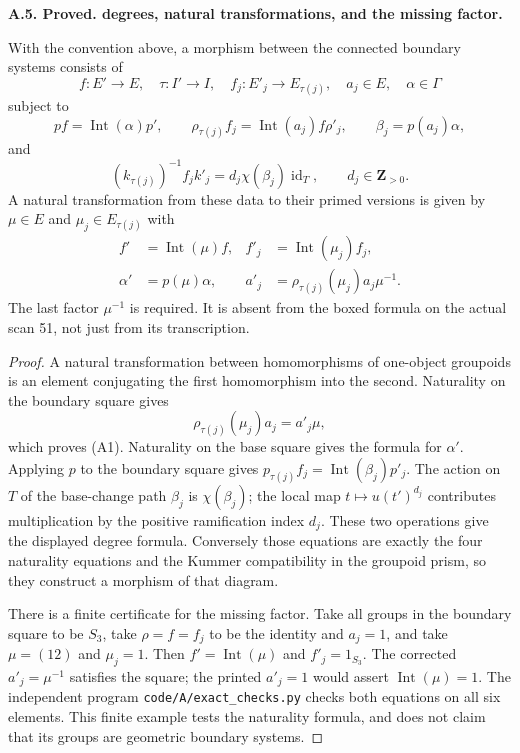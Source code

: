 \documentclass[11pt,oneside]{article}
\makeatletter
\newcounter{statementanchor}
\newenvironment{statement}[3]{%
 \refstepcounter{statementanchor}\def\@currentlabel{#1}%
 \par\addvspace{9pt}\noindent
 \textbf{#1. #2. #3.}\par\nobreak\noindent\ignorespaces
}{\par\addvspace{5pt}}
\makeatother
\begin{document}
\begin{statement}{A.5}{Proved}{degrees, natural transformations, and the missing factor}
\label{st:A.5}
\label{A:two-morphisms}
With the convention above, a morphism between the connected boundary
systems consists of
\[
 f:E'\to E,\quad \tau:I'\to I,\quad f_j:E'_j\to E_{\tau(j)},
 \quad a_j\in E,\quad \alpha\in\Gamma
\]
subject to
\[
 pf=\operatorname{Int}(\alpha)p',\qquad
 \rho_{\tau(j)}f_j=\operatorname{Int}(a_j)f\rho'_j,
 \qquad \beta_j=p(a_j)\alpha,
\]
and
\[
 (k_{\tau(j)})^{-1}f_jk'_j
       =d_j\chi(\beta_j)\operatorname{id}_T,
       \qquad d_j\in\mathbf Z_{>0}.
\]
A natural transformation from these data to their primed versions is
given by $\mu\in E$ and $\mu_j\in E_{\tau(j)}$ with
\[
\begin{aligned}
 f'&=\operatorname{Int}(\mu)f,&
 f'_j&=\operatorname{Int}(\mu_j)f_j,\\
 \alpha'&=p(\mu)\alpha,&
 a'_j&=\rho_{\tau(j)}(\mu_j)a_j\mu^{-1}.
\end{aligned}                                                  \tag{A1}
\]
The last factor $\mu^{-1}$ is required.  It is absent from the boxed
formula on the actual scan 51, not just from its transcription.
\end{statement}
\begin{proof}
A natural transformation between homomorphisms of one-object
groupoids is an element conjugating the first homomorphism into the
second.  Naturality on the boundary square gives
\[
 \rho_{\tau(j)}(\mu_j)a_j=a'_j\mu,
\]
which proves (A1).  Naturality on the base square gives the formula
for $\alpha'$.  Applying $p$ to the boundary square gives
$p_{\tau(j)}f_j=\operatorname{Int}(\beta_j)p'_j$.  The action on
$T$ of the base-change path $\beta_j$ is $\chi(\beta_j)$; the
local map $t\mapsto u(t')^{d_j}$ contributes multiplication by the
positive ramification index $d_j$.  These two operations give the
displayed degree formula.  Conversely those equations are exactly
the four naturality equations and the Kummer compatibility in the
groupoid prism, so they construct a morphism of that diagram.

There is a finite certificate for the missing factor.  Take all
groups in the boundary square to be $S_3$, take $\rho=f=f_j$ to be
the identity and $a_j=1$, and take $\mu=(12)$ and $\mu_j=1$.
Then $f'=\operatorname{Int}(\mu)$ and $f'_j=1_{S_3}$.
The corrected $a'_j=\mu^{-1}$ satisfies the square; the printed
$a'_j=1$ would assert $\operatorname{Int}(\mu)=1$.  The independent
program \texttt{code/A/exact\_checks.py} checks both equations on
all six elements.  This finite example tests the naturality formula,
and does not claim that its groups are geometric boundary systems.
\end{proof}
\end{document}
